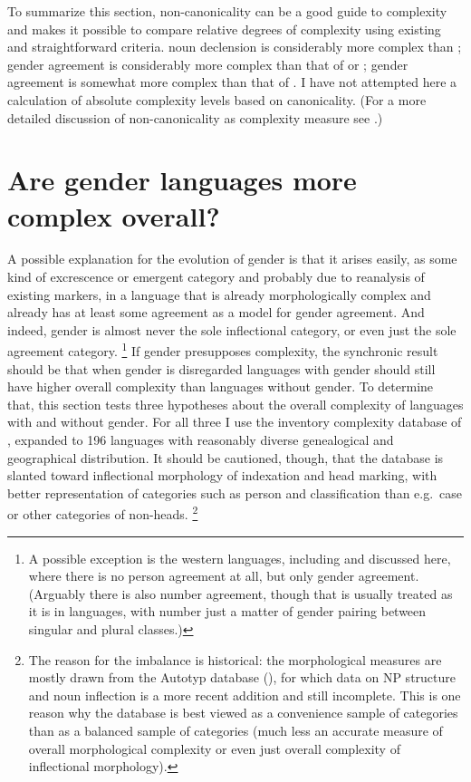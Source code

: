 \documentclass[output=collectionpaper]{langsci/langscibook}
\begin{document}
To summarize this section, non-canonicality can be a good guide to complexity and makes it possible to compare relative degrees of complexity using existing and straightforward criteria.  noun declension is considerably more complex than ;  gender agreement is considerably more complex than that of  or ;  gender agreement is somewhat more complex than that of . I have not attempted here a calculation of absolute complexity levels based on canonicality. (For a more detailed discussion of non-canonicality as complexity measure see \citealt{Nichols2016,NicholsInpress}.)


\section{Are gender languages more complex overall?}
\label{sec:Nich:3}

A possible explanation for the evolution of gender is that it arises easily, as some kind of excrescence or emergent category and probably due to reanalysis of existing markers, in a language that is already morphologically complex and already has at least some agreement as a model for gender agreement. And indeed, gender is almost never the sole inflectional category, or even just the sole agreement category.%
\footnote{%
A possible exception is the western  languages, including  and  discussed here, where there is no person agreement at all, but only gender agreement. (Arguably there is also number agreement, though that is usually treated as it is in  languages, with number just a matter of gender pairing between singular and plural classes.)
} %
If gender presupposes complexity, the synchronic result should be that when gender is disregarded languages with gender should still have higher overall complexity than languages without gender. To determine that, this section tests three hypotheses about the overall complexity of languages with and without gender. For all three I use the inventory complexity database of \citet{Nichols2009}, expanded to 196 languages with reasonably diverse genealogical and geographical distribution. It should be cautioned, though, that the database is slanted toward inflectional morphology of indexation and head marking, with better representation of categories such as person and classification than e.g.\ case or other categories of non-heads.%
\footnote{%
\label{fn:Nich:9}
The reason for the imbalance is historical: the morphological measures are mostly drawn from the Autotyp database (\citealt{Bickel2017}), for which data on NP structure and noun inflection is a more recent addition and still incomplete. This is one reason why the database is best viewed as a convenience sample of categories than as a balanced sample of categories (much less an accurate measure of overall morphological complexity or even just overall complexity of inflectional morphology).
}%
\end{document}
